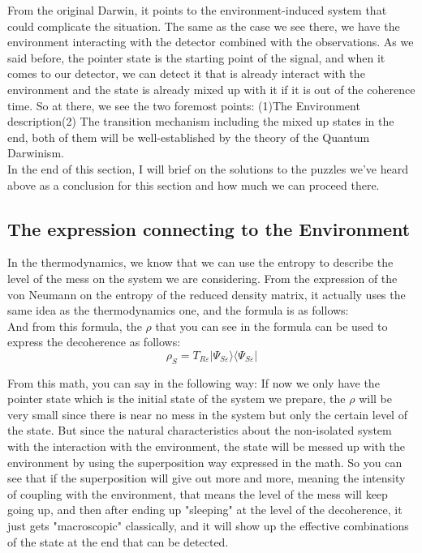 \documentclass[final,1p,12pt]{elsarticle}
\begin{document}
From the original Darwin, it points to the environment-induced system that could complicate the situation. The same as the case we see there, we have the environment interacting with the detector combined with the observations. As we said before, the pointer state is the starting point of the signal, and when it comes to our detector, we can detect it that is already interact with the environment and the state is already mixed up with it if it is out of the coherence time. So at there, we see the two foremost points: (1)The Environment description(2) The transition mechanism including the mixed up states in the end, both of them will be well-established by the theory of the Quantum Darwinism\cite{Zurek_2009}.\\

In the end of this section, I will brief on the solutions to the puzzles we've heard above as a conclusion for this section and how much we can proceed there.\\
\subsection{The expression connecting to the Environment}
In the thermodynamics, we know that we can use the entropy to describe the level of the mess on the system we are considering. From the expression of the von Neumann on the entropy of the reduced density matrix, it actually uses the same idea as the thermodynamics one, and the formula is as follows:\\

And from this formula, the $\rho$ that you can see in the formula can be used to express the decoherence as follows:\\
\begin{equation}\label{EQ1}
\rho_{S} = T_{R\varepsilon} | \Psi_{S\varepsilon} \rangle  \langle \Psi_{S\varepsilon} | 
\end{equation}

From this math, you can say in the following way: If now we only have the pointer state which is the initial state of the system we prepare, the $\rho$ will be very small since there is near no mess in the system but only the certain level of the state. But since the natural characteristics about the non-isolated system with the interaction with the environment, the state will be messed up with the environment by using the superposition way expressed in the math. So you can see that if the superposition will give out more and more, meaning the intensity of coupling with the environment, that means the level of the mess will keep going up, and then after ending up "sleeping" at the level of the decoherence, it just gets "macroscopic" classically, and it will show up the effective combinations of the state at the end that can be detected.\\
\end{document}
